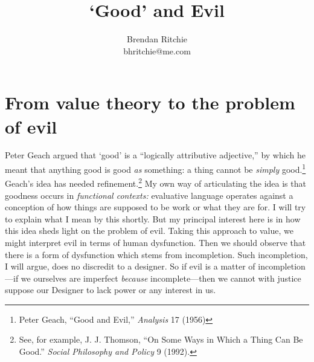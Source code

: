 \documentclass[11pt]{amsart}
\author{Brendan Ritchie\\
bhritchie@me.com}
\title{`Good' and Evil}
\begin{document}
\maketitle

\begin{comment}

\singlespacing

\begin{flushright}
Brendan Ritchie\\
britchie@fas.harvard.edu
\end{flushright}

\begin{center}
\emph{`Good' and Evil---draft of \today}


\end{center}

\doublespacing

\end{comment}








\section{From value theory to the problem of evil}



Peter Geach argued that `good' is a ``logically attributive adjective,'' by which he meant that anything good is good \emph{as} something: a thing cannot be \emph{simply} good.\footnote{Peter Geach, ``Good and Evil,'' \emph{Analysis} 17 (1956)} Geach's idea has needed refinement.\footnote{See, for example, J. J. Thomson, ``On Some Ways in Which a Thing Can Be Good.'' \emph{Social Philosophy and Policy} 9 (1992).} My own way of articulating the idea is that goodness occurs in \emph{functional contexts:} evaluative language operates against a conception of how things are supposed to be work or what they are for. I will try to explain what I mean by this shortly. But my principal interest here is in how this idea sheds light on the problem of evil. Taking this approach to value, we might interpret evil in terms of human dysfunction. Then we should observe that there is a form of dysfunction which stems from incompletion. Such incompletion, I will argue, does no discredit to a designer. So if evil is a matter of incompletion---if we ourselves are imperfect \emph{because} incomplete---then we cannot with justice suppose our Designer to lack power or any interest in us.
\end{document}
